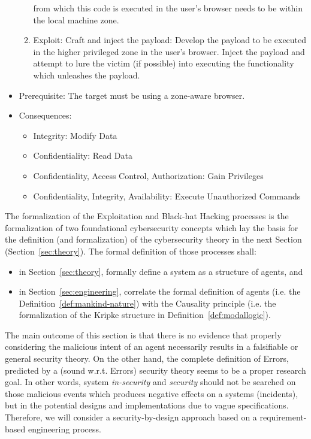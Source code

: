 \begin{example}
\begin{itemize}
\begin{enumerate}
					from which this code is executed in the
					user's browser needs to be within the
					local machine zone.
				\item Exploit: Craft and inject the payload:
					Develop the payload to be executed in
					the higher privileged zone in the
					user's browser. Inject the payload and
					attempt to lure the victim (if
					possible) into executing the
					functionality which unleashes the
					payload.
			\end{enumerate}
		\item Prerequisite: The target must be using a zone-aware browser. 
		\item Consequences: 
			\begin{itemize}
				\item Integrity: Modify Data
				\item Confidentiality: Read Data
				\item Confidentiality, Access Control, Authorization: Gain Privileges
				\item Confidentiality, Integrity, Availability: Execute Unauthorized Commands
			\end{itemize}
	\end{itemize}

\end{example}

The formalization of the Exploitation and Black-hat Hacking processes is the
formalization of two foundational cybersecurity concepts which lay the basis
for the definition (and formalization) of the cybersecurity theory in the next
Section (Section~\ref{sec:theory}). The formal definition of those
processes shall:
\begin{itemize}
	\item in Section~\ref{sec:theory}, formally define a system as a structure of agents, and
	\item in Section~\ref{sec:engineering}, correlate the formal definition of agents (i.e. the
		Definition~\ref{def:mankind-nature}) with the Causality principle (i.e.
		the formalization of the Kripke structure in
		Definition~\ref{def:modallogic}). 
\end{itemize}

The main outcome of this section is that there is no evidence that properly
considering the malicious intent of an agent necessarily results in a falsifiable or general security
theory.  On the other hand, the complete definition of Errors,
predicted by a (sound w.r.t. Errors) security theory seems to be a proper
research goal.  In other words, system \emph{in-security} and
\emph{security} should not be searched on those malicious events which produces
negative effects on a systems (incidents), but in the potential designs and
implementations due to vague specifications. Therefore, we will consider a
security-by-design approach based on a requirement-based engineering process.
